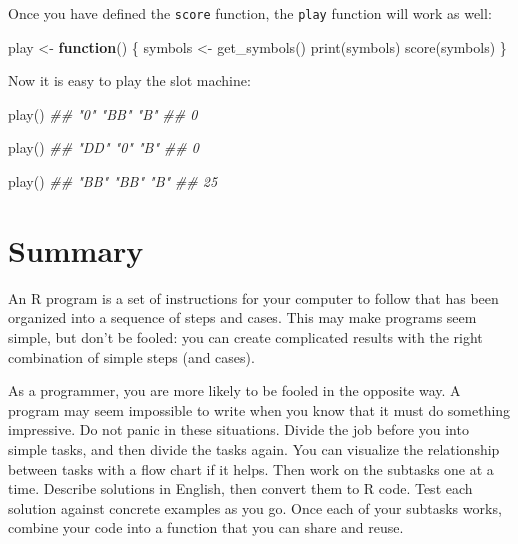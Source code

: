 \documentclass[
  letterpaper,
  DIV=11,
  numbers=noendperiod]{scrbook}
\newenvironment{Shaded}{\begin{snugshade}}{\end{snugshade}}
\newcommand{\ControlFlowTok}[1]{\textcolor[rgb]{0.00,0.23,0.31}{\textbf{#1}}}
\newcommand{\DocumentationTok}[1]{\textcolor[rgb]{0.37,0.37,0.37}{\textit{#1}}}
\newcommand{\FunctionTok}[1]{\textcolor[rgb]{0.28,0.35,0.67}{#1}}
\newcommand{\NormalTok}[1]{\textcolor[rgb]{0.00,0.23,0.31}{#1}}
\newcommand{\OtherTok}[1]{\textcolor[rgb]{0.00,0.23,0.31}{#1}}
\begin{document}
Once you have defined the \texttt{score} function, the \texttt{play}
function will work as well:

\begin{Shaded}
\begin{Highlighting}[]
\NormalTok{play }\OtherTok{\textless{}{-}} \ControlFlowTok{function}\NormalTok{() \{}
\NormalTok{  symbols }\OtherTok{\textless{}{-}} \FunctionTok{get\_symbols}\NormalTok{()}
  \FunctionTok{print}\NormalTok{(symbols)}
  \FunctionTok{score}\NormalTok{(symbols)}
\NormalTok{\}}
\end{Highlighting}
\end{Shaded}

Now it is easy to play the slot machine:

\begin{Shaded}
\begin{Highlighting}[]
\FunctionTok{play}\NormalTok{()}
\DocumentationTok{\#\# "0"  "BB" "B" }
\DocumentationTok{\#\# 0}

\FunctionTok{play}\NormalTok{()}
\DocumentationTok{\#\# "DD"  "0" "B"  }
\DocumentationTok{\#\# 0}

\FunctionTok{play}\NormalTok{()}
\DocumentationTok{\#\# "BB" "BB" "B" }
\DocumentationTok{\#\# 25}
\end{Highlighting}
\end{Shaded}

\section{Summary}\label{summary-6}

An R program is a set of instructions for your computer to follow that
has been organized into a sequence of steps and cases. This may make
programs seem simple, but don't be fooled: you can create complicated
results with the right combination of simple steps (and cases).

As a programmer, you are more likely to be fooled in the opposite way. A
program may seem impossible to write when you know that it must do
something impressive. Do not panic in these situations. Divide the job
before you into simple tasks, and then divide the tasks again. You can
visualize the relationship between tasks with a flow chart if it helps.
Then work on the subtasks one at a time. Describe solutions in English,
then convert them to R code. Test each solution against concrete
examples as you go. Once each of your subtasks works, combine your code
into a function that you can share and reuse.
\end{document}

